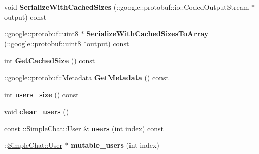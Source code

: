 \begin{DoxyCompactItemize}
\item 
\hypertarget{classSimpleChat_1_1UserListResponse_ad482db6ecf83a8774585d6c61d3c26ab}{void {\bfseries Serialize\-With\-Cached\-Sizes} (\-::google\-::protobuf\-::io\-::\-Coded\-Output\-Stream $\ast$output) const }\label{classSimpleChat_1_1UserListResponse_ad482db6ecf83a8774585d6c61d3c26ab}

\item 
\hypertarget{classSimpleChat_1_1UserListResponse_a9b075ee40113e581b5cc7bddfbb392b3}{\-::google\-::protobuf\-::uint8 $\ast$ {\bfseries Serialize\-With\-Cached\-Sizes\-To\-Array} (\-::google\-::protobuf\-::uint8 $\ast$output) const }\label{classSimpleChat_1_1UserListResponse_a9b075ee40113e581b5cc7bddfbb392b3}

\item 
\hypertarget{classSimpleChat_1_1UserListResponse_a9ffec135df81b1161c04402e083e67c2}{int {\bfseries Get\-Cached\-Size} () const }\label{classSimpleChat_1_1UserListResponse_a9ffec135df81b1161c04402e083e67c2}

\item 
\hypertarget{classSimpleChat_1_1UserListResponse_ac52be5912c5abdf036f561b110653a0d}{\-::google\-::protobuf\-::\-Metadata {\bfseries Get\-Metadata} () const }\label{classSimpleChat_1_1UserListResponse_ac52be5912c5abdf036f561b110653a0d}

\item 
\hypertarget{classSimpleChat_1_1UserListResponse_a160638ddfd252c614f2d198a77de1432}{int {\bfseries users\-\_\-size} () const }\label{classSimpleChat_1_1UserListResponse_a160638ddfd252c614f2d198a77de1432}

\item 
\hypertarget{classSimpleChat_1_1UserListResponse_ac2ba064ef33346bb6d93d7a3d0b160d1}{void {\bfseries clear\-\_\-users} ()}\label{classSimpleChat_1_1UserListResponse_ac2ba064ef33346bb6d93d7a3d0b160d1}

\item 
\hypertarget{classSimpleChat_1_1UserListResponse_a0247d22d738ad333bde0e4aad4fd388a}{const \-::\hyperlink{classSimpleChat_1_1User}{Simple\-Chat\-::\-User} \& {\bfseries users} (int index) const }\label{classSimpleChat_1_1UserListResponse_a0247d22d738ad333bde0e4aad4fd388a}

\item 
\hypertarget{classSimpleChat_1_1UserListResponse_a639e3b290026f8006abcc10ead90602c}{\-::\hyperlink{classSimpleChat_1_1User}{Simple\-Chat\-::\-User} $\ast$ {\bfseries mutable\-\_\-users} (int index)}\label{classSimpleChat_1_1UserListResponse_a639e3b290026f8006abcc10ead90602c}


\end{DoxyCompactItemize}
